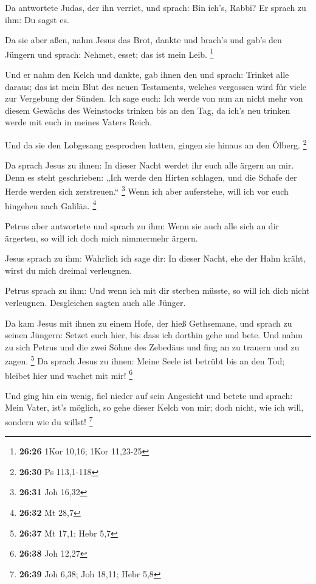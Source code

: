  Da antwortete Judas, der ihn verriet, und sprach: Bin
ich's, Rabbi? Er sprach zu ihm: Du sagst es.

 Da sie aber aßen, nahm Jesus das Brot, dankte und
brach's und gab's den Jüngern und sprach: Nehmet, esset; das ist mein
Leib. \footnote{\textbf{26:26} 1Kor 10,16; 1Kor 11,23-25}

 Und er nahm den Kelch und dankte, gab ihnen den und
sprach: Trinket alle daraus;  das ist mein Blut des neuen
Testaments, welches vergossen wird für viele zur Vergebung der Sünden.
 Ich sage euch: Ich werde von nun an nicht mehr von
diesem Gewächs des Weinstocks trinken bis an den Tag, da ich's neu
trinken werde mit euch in meines Vaters Reich.

 Und da sie den Lobgesang gesprochen hatten, gingen sie
hinaus an den Ölberg. \footnote{\textbf{26:30} Ps 113,1-118}

 Da sprach Jesus zu ihnen: In dieser Nacht werdet ihr
euch alle ärgern an mir. Denn es steht geschrieben: „Ich werde den
Hirten schlagen, und die Schafe der Herde werden sich zerstreuen.``
\footnote{\textbf{26:31} Joh 16,32}  Wenn ich aber
auferstehe, will ich vor euch hingehen nach Galiläa. \footnote{\textbf{26:32}
  Mt 28,7}

 Petrus aber antwortete und sprach zu ihm: Wenn sie auch
alle sich an dir ärgerten, so will ich doch mich nimmermehr ärgern.

 Jesus sprach zu ihm: Wahrlich ich sage dir: In dieser
Nacht, ehe der Hahn kräht, wirst du mich dreimal verleugnen.

 Petrus sprach zu ihm: Und wenn ich mit dir sterben
müsste, so will ich dich nicht verleugnen. Desgleichen sagten auch alle
Jünger.

 Da kam Jesus mit ihnen zu einem Hofe, der hieß
Gethsemane, und sprach zu seinen Jüngern: Setzet euch hier, bis dass ich
dorthin gehe und bete.  Und nahm zu sich Petrus und die
zwei Söhne des Zebedäus und fing an zu trauern und zu zagen. \footnote{\textbf{26:37}
  Mt 17,1; Hebr 5,7}  Da sprach Jesus zu ihnen: Meine
Seele ist betrübt bis an den Tod; bleibet hier und wachet mit mir!
\footnote{\textbf{26:38} Joh 12,27}

 Und ging hin ein wenig, fiel nieder auf sein Angesicht
und betete und sprach: Mein Vater, ist's möglich, so gehe dieser Kelch
von mir; doch nicht, wie ich will, sondern wie du willst! \footnote{\textbf{26:39}
  Joh 6,38; Joh 18,11; Hebr 5,8}

